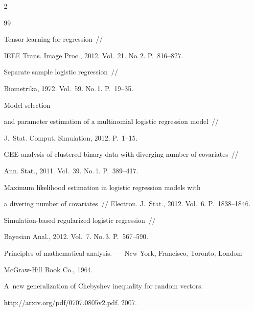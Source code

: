 \begin{multicols}{2}
{{\begin{thebibliography}{99}


 Tensor learning for regression~// 


IEEE Trans. Image Proc., 2012. Vol.~21. No.\,2. P.~816--827.







 Separate sample logistic regression~//


Biometrika, 1972. Vol.~59. No.\,1. P.~19--35.




 Model selection


and parameter estimation of a multinomial logistic regression model~// 


J.~Stat. Comput. Simulation, 2012. P.~1--15.




 GEE analysis of clustered binary data with diverging number of covariates~// 


Ann. Stat., 2011. Vol.~39. No.\,1. P.~389--417.




 Maximum likelihood estimation in logistic regression models with 


a divering number of covariates~// Electron. J.~Stat., 2012. Vol.~6. P.~1838--1846.




 Simulation-based regularized logistic regression~// 


Bayesian Anal., 2012. Vol.~7. No.\,3. P.~567--590.




 Principles of mathematical analysis.~--- New York, Francisco, Toronto, London: 


McGraw-Hill Book Co., 1964.





\label{end\stat}




 A~new generalization of Chebyshev inequality for random vectors. 


{\sf http://arxiv.org/pdf/0707.0805v2.pdf}. 2007.


\end{thebibliography}


}


}





\end{multicols}



